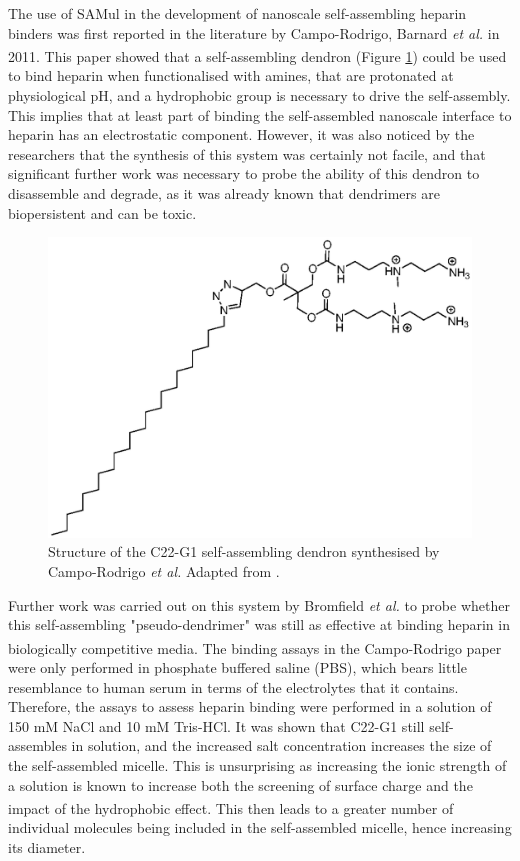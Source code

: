 The use of SAMul in the development of nanoscale self-assembling heparin binders was first reported in the literature by Campo-Rodrigo, Barnard \textit{et al.} in 2011.\textsuperscript{\cite{Rodrigo2011Self-AssemblingBinding}} This paper showed that a self-assembling dendron (Figure \ref{C22-G1_structure}) could be used to bind heparin when functionalised with amines, that are protonated at physiological pH, and a hydrophobic group is necessary to drive the self-assembly. This implies that at least part of binding the self-assembled nanoscale interface to heparin has an electrostatic component. However, it was also noticed by the researchers that the synthesis of this system was certainly not facile, and that significant further work was necessary to probe the ability of this dendron to disassemble and degrade, as it was already known that dendrimers are biopersistent and can be toxic.
\begin{figure} [h!]
\centering
\includegraphics[scale=0.75]{Figures/G1_structure.eps}
\caption{Structure of the C22-G1 self-assembling dendron synthesised by Campo-Rodrigo \textit{et al.} Adapted from \cite{Rodrigo2011Self-AssemblingBinding}.}
\label{C22-G1_structure}
\end{figure}

Further work was carried out on this system by Bromfield \textit{et al.} to probe whether this self-assembling "pseudo-dendrimer" was still as effective at binding heparin in biologically competitive media.\textsuperscript{\cite{Bromfield2014NanoscaleMedia}} The binding assays in the Campo-Rodrigo paper were only performed in phosphate buffered saline (PBS), which bears little resemblance to human serum in terms of the electrolytes that it contains. Therefore, the assays to assess heparin binding were performed in a solution of 150 mM NaCl and 10 mM Tris-HCl. It was shown that C22-G1 still self-assembles in solution, and the increased salt concentration increases the size of the self-assembled micelle. This is unsurprising as increasing the ionic strength of a solution is known to increase both the screening of surface charge and the impact of the hydrophobic effect.\textsuperscript{\cite{Bromfield2014NanoscaleMedia}} This then leads to a greater number of individual molecules being included in the self-assembled micelle, hence increasing its diameter.

